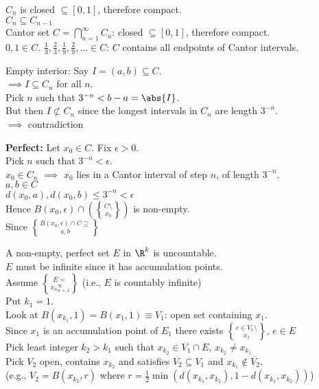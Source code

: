 $C_n$ is closed $\subseteq[0,1]$, therefore compact. \\
$C_n\subseteq C_{n-1}$ \\
Cantor set $C=\bigcap_{n=1}^\infty C_n$: closed $\subseteq[0,1]$, therefore compact. \\
$0,1\in C$.  $\frac13,\frac23,\frac19,\frac29,\dotsc\in C$: $C$ contains all endpoints of Cantor intervals.

Empty interior: Say $I=(a,b)\subseteq C$. \\
$\implies I \subseteq C_n$ for all $n$. \\
Pick $n$ such that $3^{-n}<b-a=\abs{I}$. \\
But then $I\not\subset C_n$ since the longest intervals in $C_n$ are length $3^{-n}$. \\
$\implies$ contradiction

\textbf{Perfect:} Let $x_0\in C$.  Fix $\epsilon>0$. \\
Pick $n$ such that $3^{-n}<\epsilon$. \\
$x_0\in C_n$ $\implies$ $x_0$ lies in a Cantor interval of step $n$, of length $3^{-n}$. \\
$a,b\in C$ \\
$d(x_0,a), d(x_0,b) \leq 3^{-n} < \epsilon$ \\
Hence $B(x_0,\epsilon)\cap(C\setminus\brace{x_0})$ is non-empty. \\
Since $B(x_0,\epsilon)\cap C\supseteq\brace{a,b}$

\prop A non-empty, perfect set $E$ in $\R^k$ is uncountable. \\
\pf $E$ must be infinite since it has accumulation points. \\
Assume $E=\brace{x_n}_{n=1}^\infty$ (i.e., $E$ is countably infinite) \\
Put $k_1=1$. \\
Look at $B(x_{k_1},1)=B(x_1,1)\equiv V_1$: open set containing $x_1$. \\
Since $x_1$ is an accumulation point of $E_1$ there exists $e\in V_1\setminus\brace{x_1}$, $e\in E$ \\
Pick least integer $k_2>k_1$ such that $x_{k_2}\in V_1\cap E$, $x_{k_2}\neq x_{k_1}$ \\
Pick $V_2$ open, contains $x_{k_2}$ and satisfies $\overline{V_2}\subseteq V_1$ and $x_{k_1}\notin\overline{V_2}$. \\
(e.g., $V_2=B(x_{k_2},r)$ where $r=\frac12\min(d(x_{k_1},x_{k_2}),1-d(x_{k_1},x_{k_2}))$)

